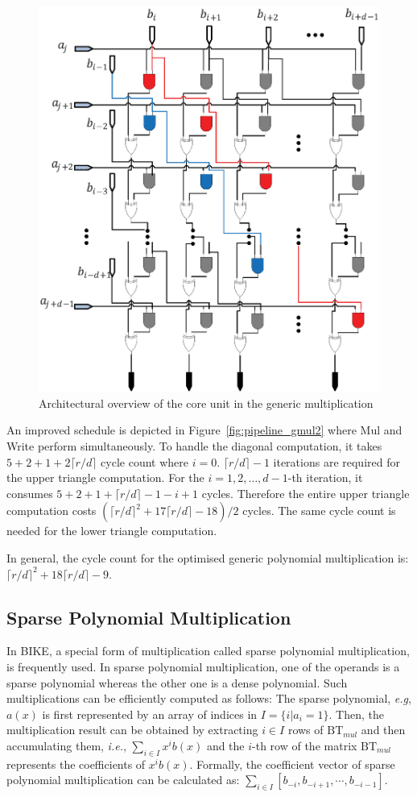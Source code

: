 \documentclass[runningheads]{llncs}
\begin{document}
\begin{figure}[!tb]
\centering
\includegraphics[width=.55\textwidth]{./fig/dsnmul_core.eps}
\caption{Architectural overview of the core unit in the generic multiplication}\label{fig:gmul_core}
\end{figure}


An improved schedule is depicted in Figure~\ref{fig:pipeline_gmul2}
where Mul and Write perform simultaneously.
To handle the diagonal computation,
it takes $5+2+1+2\lceil r/d\rceil$ cycle count where $i=0$. $\lceil r/d\rceil -1$ iterations are required for the upper triangle computation.
For the $i=1,2,\ldots,d-1$-th iteration, it
consumes $5+2+1+\lceil r/d\rceil -1-i+1$ cycles.
Therefore the entire upper triangle computation costs $(\lceil r/d\rceil^2 +17\lceil r/d\rceil-18)/2$ cycles.
The same cycle count is needed for the lower triangle computation.

In general, the cycle count for the optimised generic polynomial multiplication is:
$\lceil r/d\rceil^2 + 18\lceil r/d\rceil - 9$.



\subsection{Sparse Polynomial Multiplication}
\label{sub::sparse}
In BIKE, a special form of multiplication called sparse polynomial multiplication,
is frequently used. In sparse polynomial multiplication, one of the operands
is a sparse polynomial whereas the other one is a dense polynomial.
Such multiplications can be efficiently computed as follows:
The sparse polynomial, \textit{e.g}, $a(x)$ is first represented
by an array of indices in $I=\{i|a_i=1\}$.
Then, the multiplication result can be obtained by extracting $i\in I$ rows of $\text{BT}_{mul}$ and then accumulating them, \textit{i.e.}, $\sum_{i\in I} x^ib(x)$ and the $i$-th row of the matrix $\text{BT}_{mul}$ represents the coefficients of $x^ib(x)$. Formally, the coefficient vector of sparse polynomial multiplication can be calculated as:
$\sum_{i\in I} [b_{-i},b_{-i+1},\cdots,b_{-i-1}]$.
\end{document}
